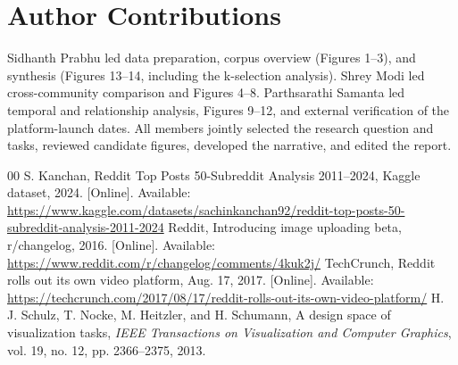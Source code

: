 \documentclass[conference]{IEEEtran}
\begin{document}
\section*{Author Contributions}
Sidhanth Prabhu led data preparation, corpus overview (Figures 1--3), and synthesis (Figures 13--14, including the k-selection analysis). Shrey Modi led cross-community comparison and Figures 4--8. Parthsarathi Samanta led temporal and relationship analysis, Figures 9--12, and external verification of the platform-launch dates. All members jointly selected the research question and tasks, reviewed candidate figures, developed the narrative, and edited the report.

\begin{thebibliography}{00}
 S. Kanchan, Reddit Top Posts 50-Subreddit Analysis 2011--2024, Kaggle dataset, 2024. [Online]. Available: \url{https://www.kaggle.com/datasets/sachinkanchan92/reddit-top-posts-50-subreddit-analysis-2011-2024}
 Reddit, Introducing image uploading beta, r/changelog, 2016. [Online]. Available: \url{https://www.reddit.com/r/changelog/comments/4kuk2j/}
 TechCrunch, Reddit rolls out its own video platform, Aug. 17, 2017. [Online]. Available: \url{https://techcrunch.com/2017/08/17/reddit-rolls-out-its-own-video-platform/}
 H. J. Schulz, T. Nocke, M. Heitzler, and H. Schumann, A design space of visualization tasks, \emph{IEEE Transactions on Visualization and Computer Graphics}, vol. 19, no. 12, pp. 2366--2375, 2013.
\end{thebibliography}
\end{document}
